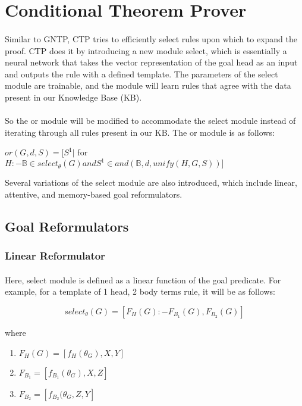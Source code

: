 \documentclass[Other]{iitddiss}
\begin{document}
\section{Conditional Theorem Prover}
\paragraph{}
Similar to GNTP, CTP tries to efficiently select rules upon which to expand the proof. CTP does it by introducing a new module select, which is essentially a neural network that takes the vector representation of the goal head as an input and outputs the rule with a defined template. The parameters of the select module are trainable, and the module will learn rules that agree with the data present in our Knowledge Base (KB).

\paragraph{}
So the or module will be modified to accommodate the select module instead of iterating through all rules present in our KB. The or module is as follows:

\( or(G, d, S) = [ S^1 | \) for \( H:-\mathbb{B} \in select_{\theta}(G) and S^1 \in and(\mathbb{B}, d, unify(H, G, S)) ] \)

Several variations of the select module are also introduced, which include linear, attentive, and memory-based goal reformulators.

\subsection{Goal Reformulators}
\subsubsection{Linear Reformulator}
\paragraph{}
Here, select module is defined as a linear function of the goal predicate. For example, for a template of 1 head, 2 body terms rule, it will be as follows:

\[ select_{\theta}(G) = [ F_H(G) :- F_{B_1}(G), F_{B_2}(G)] \]

where
\begin{enumerate}
	\item \( F_H(G) = [ f_H(\theta_G), X, Y] \)
	\item \( F_{B_1} = [ f_{B_1}(\theta_G), X, Z] \)
	\item \( F_{B_2} = [ f_{B_2}(\theta_G, Z, Y] \)
\end{enumerate}
\end{document}
